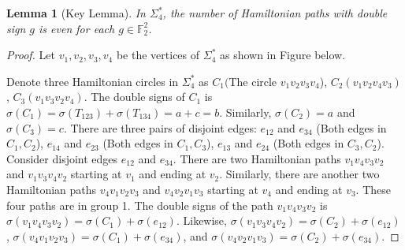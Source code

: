 \documentclass[12pt]{amsart}
\theoremstyle{plain}
\newtheorem{lemma}[theorem]{Lemma}
\theoremstyle{definition}%
\begin{document}
\begin{lemma}[Key Lemma]\label{key}
In $\Sigma_4^*$, the number of Hamiltonian paths with double sign $g$ is even for each $g\in \mathbb{F}_2^2$. 

\end{lemma}
\begin{proof}
    


Let $v_1,v_2,v_3,v_4$ be the vertices of $\Sigma_4^*$ as shown in Figure below.  

\vspace{1cm}

\begin{figure}[H]
    \centering
{}
\label{key2}
 \caption{}
\end{figure}

\vspace{1cm}









Denote three Hamiltonian circles in $\Sigma_4^*$ as
$C_1 ($The circle $v_1v_2v_3v_4$), $C_2 (v_1v_2v_4v_3)$, $C_3 (v_1v_3v_2v_4)$. The double signs of  $C_1$   is $\sigma(C_1)=\sigma(T_{123})+\sigma(T_{134})=a+c=b$. Similarly, $\sigma(C_2)=a$  and $\sigma(C_3)=c$.  There are three pairs of disjoint edges: $e_{12}$ and $e_{34}$ (Both edges in $C_1,C_2$), $e_{14}$ and $e_{23}$ (Both edges in $C_1,C_3$), $e_{13}$ and $e_{24}$ (Both edges in $C_3,C_2$).  Consider disjoint edges $e_{12}$ and $e_{34}$.
 There are two Hamiltonian paths $v_1v_4v_3v_2$ and $v_1v_3v_4v_2$ starting at $v_1$ and ending at $v_2$. Similarly, there are another two Hamiltonian paths $v_4v_1v_2v_3$ and $v_4v_2v_1v_3$ starting at $v_4$ and ending at $v_3$. These four paths are in group 1. 
The double signs of 
 the path $v_1v_4v_3v_2$ is $\sigma(v_1v_4v_3v_2)=\sigma(C_1)+\sigma(e_{12})$. Likewise, $\sigma(v_1v_3v_4v_2)=\sigma(C_2)+\sigma(e_{12})$, $\sigma(v_4v_1v_2v_3)=\sigma(C_1)+\sigma(e_{34})$,  and
$\sigma(v_4v_2v_1v_3)=\sigma(C_2)+\sigma(e_{34})$. 



\end{proof}
\end{document}
